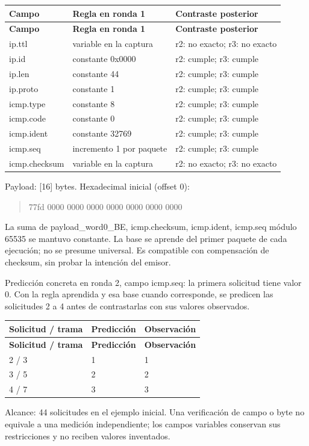 \begingroup
\fontsize{9}{11}\selectfont
\addtocounter{table}{-1}
\begin{longtable}{p{3.1cm}p{5.8cm}p{5.1cm}}
\toprule
\textbf{Campo} & \textbf{Regla en ronda 1} & \textbf{Contraste posterior} \\ \midrule
\endfirsthead
\toprule
\textbf{Campo} & \textbf{Regla en ronda 1} & \textbf{Contraste posterior} \\ \midrule
\endhead
ip.ttl & variable en la captura & r2: no exacto; r3: no exacto \\
ip.id & constante 0x0000 & r2: cumple; r3: cumple \\
ip.len & constante 44 & r2: cumple; r3: cumple \\
ip.proto & constante 1 & r2: cumple; r3: cumple \\
icmp.type & constante 8 & r2: cumple; r3: cumple \\
icmp.code & constante 0 & r2: cumple; r3: cumple \\
icmp.ident & constante 32769 & r2: cumple; r3: cumple \\
icmp.seq & incremento 1 por paquete & r2: cumple; r3: cumple \\
icmp.checksum & variable en la captura & r2: no exacto; r3: no exacto \\
\bottomrule
\end{longtable}
\endgroup
Payload: [16] bytes. Hexadecimal inicial (offset 0):

\begin{quote}\ttfamily\footnotesize\raggedright 77fd 0000 0000 0000 0000 0000 0000 0000\end{quote}
La suma de payload\_\allowbreak{}word0\_\allowbreak{}BE, icmp.checksum, icmp.ident, icmp.seq módulo 65535 se mantuvo constante. La base se aprende del primer paquete de cada ejecución; no se presume universal. Es compatible con compensación de checksum, sin probar la intención del emisor.

Predicción concreta en ronda 2, campo icmp.seq: la primera solicitud tiene valor 0. Con la regla aprendida y esa base cuando corresponde, se predicen las solicitudes 2 a 4 antes de contrastarlas con sus valores observados.

\begingroup
\fontsize{9}{11}\selectfont
\addtocounter{table}{-1}
\begin{longtable}{p{3.2cm}p{5.1cm}p{5.1cm}}
\toprule
\textbf{Solicitud / trama} & \textbf{Predicción} & \textbf{Observación} \\ \midrule
\endfirsthead
\toprule
\textbf{Solicitud / trama} & \textbf{Predicción} & \textbf{Observación} \\ \midrule
\endhead
2 / 3 & 1 & 1 \\
3 / 5 & 2 & 2 \\
4 / 7 & 3 & 3 \\
\bottomrule
\end{longtable}
\endgroup
Alcance: 44 solicitudes en el ejemplo inicial. Una verificación de campo o byte no equivale a una medición independiente; los campos variables conservan sus restricciones y no reciben valores inventados.

